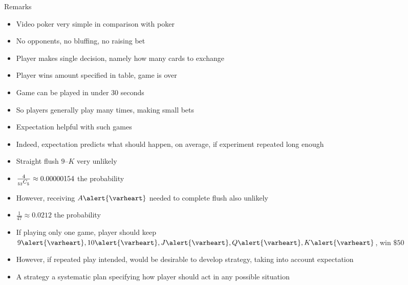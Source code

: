 \documentclass[handout,xcolor=dvipsnames]{beamer}
\theoremstyle{definition}
\newcommand\ncr[2]{\tensor[_{#1}]C{_{#2}}}
\newcommand{\hs}{\alert{\varheart}}
\begin{document}
\begin{frame}{Remarks}
\begin{itemize}
\item Video poker very simple in comparison with poker
\item No opponents, no bluffing, no raising bet
\item Player makes single decision, namely how many
cards to exchange
\item Player wins amount specified in table, game is over
\item Game can be played in under 30 seconds
\item So players generally play many times, making small bets
\item Expectation helpful with such games
\item Indeed, expectation predicts what should
happen, on average, if 
experiment repeated long enough
\end{itemize}
\end{frame}

\begin{frame}
\begin{itemize}
\item Straight flush $9$--$K$ very unlikely
\item $\frac{4}{\ncr{52}{5}}\approx 0.00000154$ the probability
\item However, receiving $A\hs$ needed to complete flush
also unlikely
\item $\frac{1}{47}\approx 0.0212$ the probability
\item If playing only one game, player should
keep $9\hs,10\hs,J\hs,Q\hs,K\hs$, win $\$50$
\item However, if repeated play intended, would
be desirable to develop \alert{strategy}, taking
into account expectation
\item A \alert{strategy} a systematic plan specifying 
how player should act in any possible situation
\end{itemize}
\end{frame}
\end{document}
